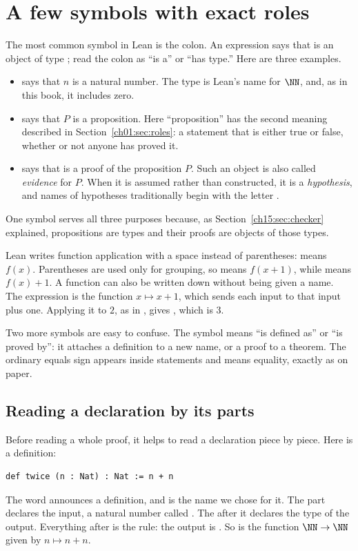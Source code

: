 \section{A few symbols with exact roles}\label{ch15:sec:symbols}
The most common symbol in Lean is the colon. An expression  says that  is an object of type ; read the colon as ``is a'' or ``has type.'' Here are three examples.
\begin{itemize}
\item {} says that $n$ is a natural number. The type  is Lean's name for $\NN$, and, as in this book, it includes zero.
\item {} says that $P$ is a proposition. Here ``proposition'' has the second meaning described in Section~\ref{ch01:sec:roles}: a statement that is either true or false, whether or not anyone has proved it.
\item {} says that  is a proof of the proposition $P$. Such an object is also called \emph{evidence} for $P$. When it is assumed rather than constructed, it is a \emph{hypothesis}, and names of hypotheses traditionally begin with the letter .
\end{itemize}
One symbol serves all three purposes because, as Section~\ref{ch15:sec:checker} explained, propositions are types and their proofs are objects of those types.

Lean writes function application with a space instead of parentheses:  means $f(x)$. Parentheses are used only for grouping, so  means $f(x+1)$, while  means $f(x)+1$. A function can also be written down without being given a name. The expression  is the function $x\mapsto x+1$, which sends each input to that input plus one. Applying it to $2$, as in , gives , which is $3$.

Two more symbols are easy to confuse. The symbol \code{:=} means ``is defined as'' or ``is proved by'': it attaches a definition to a new name, or a proof to a theorem. The ordinary equals sign \code{=} appears inside statements and means equality, exactly as on paper.

\subsection*{Reading a declaration by its parts}
Before reading a whole proof, it helps to read a declaration piece by piece. Here is a definition:
\par\noindent\begin{minipage}{\linewidth}
\begin{lstlisting}
def twice (n : Nat) : Nat := n + n
\end{lstlisting}
\end{minipage}\par
The word  announces a definition, and  is the name we chose for it. The part  declares the input, a natural number called . The  after it declares the type of the output. Everything after \code{:=} is the rule: the output is . So  is the function $\NN\to\NN$ given by $n\mapsto n+n$.

